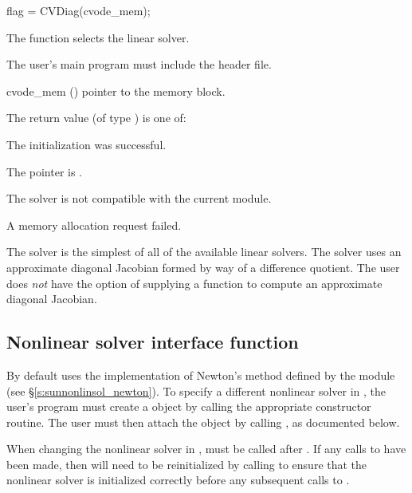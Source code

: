 {
  flag = CVDiag(cvode\_mem);
}
{
  The function  selects the {\cvdiag} linear solver.

  The user's main program must include the  header file.
}
{
  \begin{args}
  \item[cvode\_mem] ()
    pointer to the {\cvode} memory block.
  \end{args}
}
{
  The return value  (of type ) is one of:
  \begin{args}
  \item[\Id{CVDIAG\_SUCCESS}]
    The {\cvdiag} initialization was successful.
  \item[\Id{CVDIAG\_MEM\_NULL}]
    The  pointer is .
  \item[\Id{CVDIAG\_ILL\_INPUT}]
    The {\cvdiag} solver is not compatible with the current {\nvector} module.
  \item[\Id{CVDIAG\_MEM\_FAIL}]
    A memory allocation request failed.
  \end{args}
}
{
  The {\cvdiag} solver is the simplest of all of the available {\cvode}
  linear solvers.  The {\cvdiag} solver uses an approximate
  diagonal Jacobian formed by way of a difference quotient. The user
  does {\em not} have the option of supplying a function to compute an
  approximate diagonal Jacobian.
}
\subsection{Nonlinear solver interface function}
\label{ss:nonlin_solv_init}

By default {\cvode} uses the {\sunnonlinsol} implementation of Newton's method
defined by the {\sunnonlinsolnewton} module (see \S\ref{s:sunnonlinsol_newton}).
To specify a different nonlinear solver in {\cvode}, the user's program must
create a {\sunnonlinsol} object by calling the appropriate constructor routine.
The user must then attach the {\sunnonlinsol} object by calling
, as documented below.

When changing the nonlinear solver in {\cvode},  must
be called after . If any calls to  have been made, then
{\cvode} will need to be reinitialized by calling  to ensure
that the nonlinear solver is initialized correctly before any subsequent calls
to .

